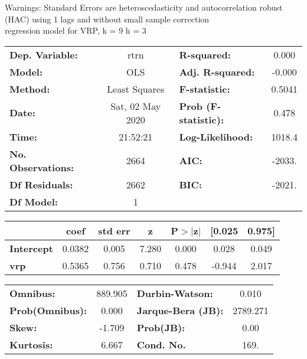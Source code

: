 Warnings: \newline
 [1] Standard Errors are heteroscedasticity and autocorrelation robust (HAC) using 1 lags and without small sample correction\\ 

regression model for VRP, k = 9 h = 3\begin{center}
\begin{tabular}{lclc}
\toprule
\textbf{Dep. Variable:}    &       rtrn       & \textbf{  R-squared:         } &     0.000   \\
\textbf{Model:}            &       OLS        & \textbf{  Adj. R-squared:    } &    -0.000   \\
\textbf{Method:}           &  Least Squares   & \textbf{  F-statistic:       } &    0.5041   \\
\textbf{Date:}             & Sat, 02 May 2020 & \textbf{  Prob (F-statistic):} &    0.478    \\
\textbf{Time:}             &     21:52:21     & \textbf{  Log-Likelihood:    } &    1018.4   \\
\textbf{No. Observations:} &        2664      & \textbf{  AIC:               } &    -2033.   \\
\textbf{Df Residuals:}     &        2662      & \textbf{  BIC:               } &    -2021.   \\
\textbf{Df Model:}         &           1      & \textbf{                     } &             \\
\bottomrule
\end{tabular}
\begin{tabular}{lcccccc}
                   & \textbf{coef} & \textbf{std err} & \textbf{z} & \textbf{P$> |$z$|$} & \textbf{[0.025} & \textbf{0.975]}  \\
\midrule
\textbf{Intercept} &       0.0382  &        0.005     &     7.280  &         0.000        &        0.028    &        0.049     \\
\textbf{vrp}       &       0.5365  &        0.756     &     0.710  &         0.478        &       -0.944    &        2.017     \\
\bottomrule
\end{tabular}
\begin{tabular}{lclc}
\textbf{Omnibus:}       & 889.905 & \textbf{  Durbin-Watson:     } &    0.010  \\
\textbf{Prob(Omnibus):} &   0.000 & \textbf{  Jarque-Bera (JB):  } & 2789.271  \\
\textbf{Skew:}          &  -1.709 & \textbf{  Prob(JB):          } &     0.00  \\
\textbf{Kurtosis:}      &   6.667 & \textbf{  Cond. No.          } &     169.  \\
\bottomrule
\end{tabular}
\end{center}

